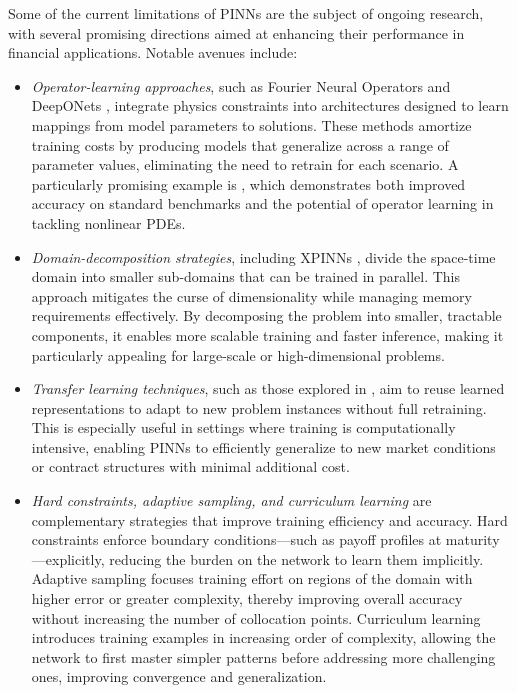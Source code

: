 \documentclass[12pt]{report} %
\theoremstyle{plain} %
\theoremstyle{definition} %
\theoremstyle{remark} %
\begin{document}
Some of the current limitations of PINNs are the subject of ongoing research, with several promising 
directions aimed at enhancing their performance in financial applications. Notable avenues include:

\begin{itemize}
\item \emph{Operator-learning approaches}, such as Fourier Neural Operators \cite{li2021fourierneuraloperatorparametric} 
and DeepONets \cite{deeponets}, integrate physics constraints into architectures designed to learn mappings 
from model parameters to solutions. These methods amortize training costs by producing models that generalize 
across a range of parameter values, eliminating the need to retrain for each scenario. A particularly promising 
example is \cite{LI2025128675}, which demonstrates both improved accuracy on standard benchmarks and the potential 
of operator learning in tackling nonlinear PDEs.

\item \emph{Domain-decomposition strategies}, including XPINNs \cite{CiCP-28-5}, divide the space-time domain into 
smaller sub-domains that can be trained in parallel. This approach mitigates the curse of dimensionality while managing memory 
requirements effectively. By decomposing the problem into smaller, tractable components, it enables more scalable training and 
faster inference, making it particularly appealing for large-scale or high-dimensional problems.

\item \emph{Transfer learning techniques}, such as those explored in \cite{pellegrin2022transferlearningphysicsinformedneural, Gao_2022}, 
aim to reuse learned representations to adapt to new problem instances without full retraining. This is especially useful in settings 
where training is computationally intensive, enabling PINNs to efficiently generalize to new market conditions or contract structures 
with minimal additional cost.

\item \emph{Hard constraints, adaptive sampling, and curriculum learning} are complementary strategies that improve training efficiency and 
accuracy. Hard constraints \cite{LI202460} enforce boundary conditions—such as payoff profiles at maturity—explicitly, reducing the burden 
on the network to learn them implicitly. Adaptive sampling \cite{WU2023115671} focuses training effort on regions of the domain with higher 
error or greater complexity, thereby improving overall accuracy without increasing the number of collocation points. Curriculum learning 
\cite{bekele2024physicsinformedneuralnetworkscurriculum} introduces training examples in increasing order of complexity, allowing the network 
to first master simpler patterns before addressing more challenging ones, improving convergence and generalization.

\end{itemize}
\end{document}
